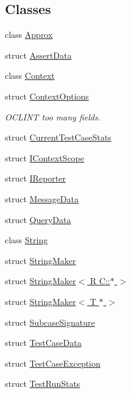 \subsection*{Classes}
\begin{DoxyCompactItemize}
\item 
class \hyperlink{classdoctest_1_1_approx}{Approx}
\item 
struct \hyperlink{structdoctest_1_1_assert_data}{Assert\+Data}
\item 
class \hyperlink{classdoctest_1_1_context}{Context}
\item 
struct \hyperlink{structdoctest_1_1_context_options}{Context\+Options}
\begin{DoxyCompactList}\small\item\em O\+C\+L\+I\+NT too many fields. \end{DoxyCompactList}\item 
struct \hyperlink{structdoctest_1_1_current_test_case_stats}{Current\+Test\+Case\+Stats}
\item 
struct \hyperlink{structdoctest_1_1_i_context_scope}{I\+Context\+Scope}
\item 
struct \hyperlink{structdoctest_1_1_i_reporter}{I\+Reporter}
\item 
struct \hyperlink{structdoctest_1_1_message_data}{Message\+Data}
\item 
struct \hyperlink{structdoctest_1_1_query_data}{Query\+Data}
\item 
class \hyperlink{classdoctest_1_1_string}{String}
\item 
struct \hyperlink{structdoctest_1_1_string_maker}{String\+Maker}
\item 
struct \hyperlink{structdoctest_1_1_string_maker_3_01_r_01_c_1_1_5_01_4}{String\+Maker$<$ R C\+::$\ast$ $>$}
\item 
struct \hyperlink{structdoctest_1_1_string_maker_3_01_t_01_5_01_4}{String\+Maker$<$ T $\ast$ $>$}
\item 
struct \hyperlink{structdoctest_1_1_subcase_signature}{Subcase\+Signature}
\item 
struct \hyperlink{structdoctest_1_1_test_case_data}{Test\+Case\+Data}
\item 
struct \hyperlink{structdoctest_1_1_test_case_exception}{Test\+Case\+Exception}
\item 
struct \hyperlink{structdoctest_1_1_test_run_stats}{Test\+Run\+Stats}
\end{DoxyCompactItemize}

